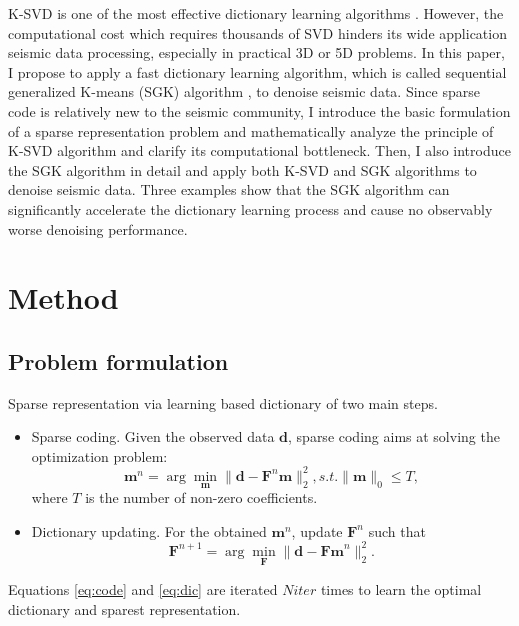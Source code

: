 K-SVD is one of the most effective dictionary learning algorithms \cite[]{aharon2006}. However, the computational cost which requires thousands of SVD  hinders its wide application  seismic data processing, especially in practical 3D or 5D problems. In this paper, I propose to apply a fast dictionary learning algorithm, which is called sequential generalized K-means (SGK) algorithm \cite[]{sgk2013}, to denoise  seismic data. Since sparse code is relatively new to the seismic community, I introduce the basic formulation of a sparse representation problem and mathematically analyze the principle of K-SVD algorithm and clarify its computational bottleneck. Then, I also introduce the SGK algorithm in detail and apply both K-SVD and SGK algorithms to denoise  seismic data. Three examples show that the SGK algorithm can significantly accelerate the dictionary learning process and cause no observably worse denoising performance.


\section{Method}
\subsection{Problem formulation}
Sparse representation via learning based dictionary  of two main steps.
\begin{itemize}
\item Sparse coding. Given the observed data $\mathbf{d}$, sparse coding aims at solving the optimization problem:
\begin{equation}
\label{eq:code}
\mathbf{m}^n = \arg \min_{\mathbf{m}} \parallel \mathbf{d} - \mathbf{F}^n\mathbf{m} \parallel_2^2, s.t. \parallel \mathbf{m} \parallel_0 \le T,
\end{equation}
where  $T$ is the number of non-zero coefficients. 
\item Dictionary updating.
For the obtained $\mathbf{m}^n$, update $\mathbf{F}^n$ such that
\begin{equation}
\label{eq:dic}
\mathbf{F}^{n+1} = \arg \min_{\mathbf{F}} \parallel \mathbf{d} - \mathbf{Fm}^n \parallel _2^2.
\end{equation}
\end{itemize}
Equations \ref{eq:code} and \ref{eq:dic} are iterated $Niter$ times to learn the optimal dictionary and  sparest representation. 

